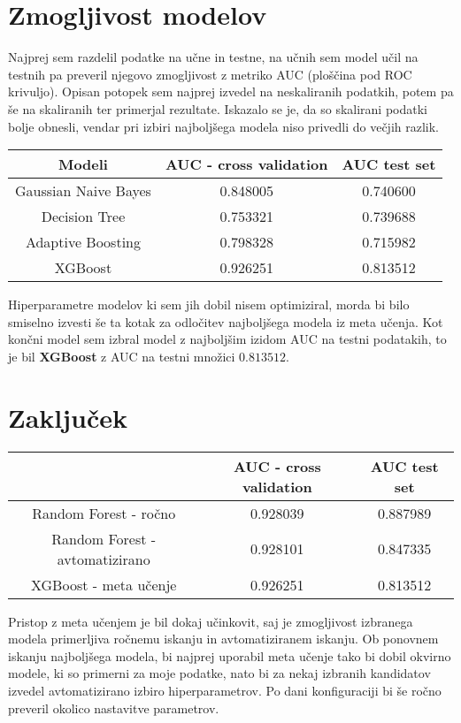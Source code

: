 \documentclass[12pt]{article}
\begin{document}
\section{Zmogljivost modelov}

Najprej sem razdelil podatke na učne in testne, na učnih sem model učil na testnih pa preveril
njegovo zmogljivost z metriko AUC (ploščina pod ROC krivuljo).
Opisan potopek sem najprej izvedel na neskaliranih podatkih, potem pa še 
na skaliranih ter primerjal rezultate. Iskazalo se je, da so 
skalirani podatki bolje obnesli, vendar pri izbiri najboljšega modela 
niso privedli do večjih razlik.


\begin{center}
    \begin{tabular}{||c| c c||} 
        \hline
        Modeli & AUC - cross validation &  AUC test set \\ [0.5ex] 
        \hline\hline
        Gaussian Naive Bayes & 0.848005  & 0.740600 \\
        \hline
        Decision Tree & 0.753321  & 0.739688\\
        \hline
        Adaptive Boosting & 0.798328 & 0.715982\\
        \hline
        XGBoost & 0.926251 & 0.813512 \\
        \hline
    \end{tabular}
\end{center}
Hiperparametre modelov ki sem jih dobil nisem optimiziral, morda bi bilo smiselno izvesti 
še ta kotak za odločitev najboljšega modela iz meta učenja.
Kot končni model sem izbral model z najboljšim izidom AUC na testni podatakih, to je bil
\textbf{XGBoost} z AUC na testni množici $0.813512$.

\section{Zaključek}

\begin{center}
    \begin{tabular}{||c| c c||} 
        \hline
         & AUC - cross validation &  AUC test set \\ [0.5ex] 
        \hline\hline
        Random Forest - ročno & 0.928039  & 0.887989 \\
        \hline
        Random Forest - avtomatizirano & 0.928101 & 0.847335\\
        \hline
        XGBoost - meta učenje & 0.926251 & 0.813512 \\
        \hline
    \end{tabular}
\end{center}

Pristop z meta učenjem je bil dokaj učinkovit, saj je zmogljivost izbranega modela 
primerljiva ročnemu iskanju in avtomatiziranem iskanju. Ob ponovnem iskanju najboljšega
modela, bi najprej uporabil meta učenje tako bi dobil okvirno modele, ki so primerni za moje 
podatke, nato bi za nekaj izbranih kandidatov izvedel avtomatizirano izbiro hiperparametrov.
Po dani konfiguraciji bi še ročno preveril okolico nastavitve parametrov.
\end{document}
